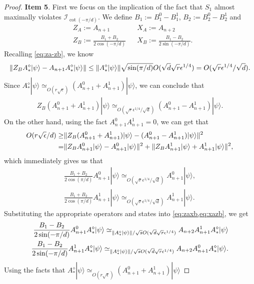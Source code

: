 \documentclass[11pt,letterpaper]{article}
\newcommand{\ket}[1]{|#1\rangle}
\DeclarePairedDelimiter{\norm}{\lVert}{\rVert}
\newcommand{\1}{\mathbb{1}}
\newcommand{\I}{\mathcal{I}}
\newcommand{\se}{\sqrt{\epsilon}}
\newcommand{\qe}{\epsilon^{1/4}}
\newcommand{\sd}{\sqrt{d}}
\newcommand{\sr}{\sqrt{r}}
\newcommand{\appd}[1]{\simeq_{#1}}
\theoremstyle{definition}
\begin{document}
\begin{proof}
	\textbf{Item 5}.
	First we focus on the implication of the fact that $S_1$ almost maximally violates $\I_{\cot(-\pi/d)}$.
	We define $B_1 := B_1^0 - B_1^1$, $B_2 := B_2^0-B_2^1$ and
	\begin{align}
		&Z_A  := A_{n+1} && X_A := A_{n+2} \\
		&Z_B := \frac{B_1+B_2}{2\cos(-\pi/d)} && X_B := \frac{B_1-B_2}{2\sin(-\pi/d)}.
	\end{align}
	Recalling \cref{eq:za-zb}, we know
	\begin{align}
		\norm{Z_B A_\ast^\diamond \ket{\psi} - A_{n+1}A_\ast^\diamond \ket{\psi}} \leq 
		\norm{A_\ast^\diamond \ket{\psi}} \sqrt{\sin(\pi/d)}O(\sd \sr \qe)
		= O(\sr \qe/ \sd ).
	\end{align}
	Since $A_\ast^\diamond \ket{\psi} \appd{O(r\se)} (A_{n+1}^0 + A_{n+1}^1) \ket{\psi}$,
	we can conclude that 
	\begin{align}
		Z_B (A_{n+1}^0 + A_{n+1}^1) \ket{\psi} \appd{O(\sr \qe / \sd )} (A_{n+1}^0 - A_{n+1}^1) \ket{\psi}.
	\end{align}
	On the other hand, using the fact $A_{n+1}^0 A_{n+1}^1 = 0$, we can get that
	\begin{align}
		O(r\se/d) \geq &\norm{Z_B (A_{n+1}^0 + A_{n+1}^1) \ket{\psi} - (A_{n+1}^0 - A_{n+1}^1) \ket{\psi}}^2\\
		=&\norm{ Z_BA_{n+1}^0 \ket{\psi} - A_{n+1}^0\ket{\psi}}^2 + \norm{ Z_BA_{n+1}^1 \ket{\psi} + A_{n+1}^1\ket{\psi}}^2,
	\end{align}
	which immediately gives us that 
	\begin{align}
		\frac{B_1+B_2}{2\cos(\pi/d)} A_{n+1}^0\ket{\psi} \appd{O( \sr \qe /\sd)} A_{n+1}^0 \ket{\psi},\\
		\frac{B_1+B_2}{2\cos(\pi/d)} A_{n+1}^1\ket{\psi} \appd{O( \sr \qe /\sd)} A_{n+1}^1 \ket{\psi}.
	\end{align}
		Substituting the appropriate operators and states into \cref{eq:zaxb,eq:xazb}, we get
	\begin{align}
		\frac{B_1-B_2}{2 \sin(-\pi/d)} A_{n+1}^0A_\ast^\diamond \ket{\psi} 
		\appd{\norm{A_\ast^\diamond\ket{\psi}}/\sqrt{s} O(\sd \sr \qe)}A_{n+2} A_{n+1}^1A_\ast^\diamond\ket{\psi}\\
		\frac{B_1 -B_2}{2\sin(-\pi/d)} A_{n+1}^1A_\ast^\diamond \ket{\psi}  
		\appd{\norm{A_\ast^\diamond\ket{\psi}}/\sqrt{s}O(\sd \sr \qe)}A_{n+2} A_{n+1}^0 A_\ast^\diamond \ket{\psi}.
	\end{align}
	Using the facts that $A_\ast^\diamond \ket{\psi} \appd{O(r\se)} (A_{n+1}^0 + A_{n+1}^1) \ket{\psi}$

\end{proof}
\end{document}
